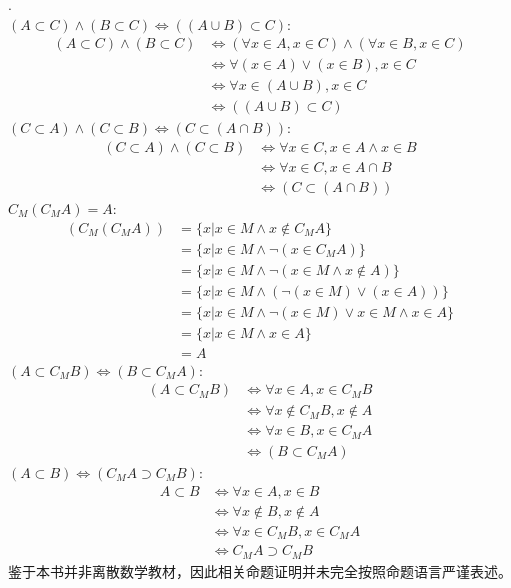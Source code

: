 \begin{solution}
\label{sol:b1-c1-s2-q1}
.\\
$(A\subset C)\land (B\subset C)\Leftrightarrow ((A\cup B)\subset C)$:
\begin{align*}
 (A\subset C)\land (B\subset C)&\Leftrightarrow (\forall x\in A, x\in C)\land (\forall x\in B,x\in C)\\
&\Leftrightarrow \forall (x\in A)\lor (x\in B),x\in C\\
&\Leftrightarrow \forall x\in (A\cup B),x\in C\\
&\Leftrightarrow ((A\cup B)\subset C)
\end{align*}
$(C\subset A)\land (C\subset B)\Leftrightarrow (C\subset (A\cap B))$:
\begin{align*}
(C\subset A)\land (C\subset B)&\Leftrightarrow \forall x\in C,x\in A\land x\in B\\
&\Leftrightarrow \forall x\in C,x\in A\cap B\\
&\Leftrightarrow (C\subset (A\cap B))
\end{align*}
$C_M(C_M A)=A$:
\begin{align*}
(C_M(C_M A))&=\{x| x\in M\land x\notin C_M A\}\\
&=\{x| x\in M\land \lnot (x\in C_M A) \}\\
&=\{x| x\in M\land \lnot(x\in M\land x\notin A)\}\\
&=\{x| x\in M \land (\lnot(x\in M)\lor (x\in A))\}\\
&=\{x| x\in M\land \lnot (x\in M)\lor x\in M\land x\in A \}\\
&=\{x| x\in M\land x\in A\}\\
&=A
\end{align*}
$(A\subset C_M B)\Leftrightarrow (B\subset C_M A)$:
\begin{align*}
(A\subset C_M B)&\Leftrightarrow \forall x\in A, x\in C_M B\\
&\Leftrightarrow \forall x\notin C_M B,x\notin A\\
&\Leftrightarrow \forall x\in B,x\in C_M A\\
&\Leftrightarrow (B\subset C_M A)
\end{align*}
$(A\subset B)\Leftrightarrow (C_M A\supset C_M B)$:
\begin{align*}
A\subset B&\Leftrightarrow \forall x\in A,x\in B\\
&\Leftrightarrow \forall x\notin B,x\notin A\\
&\Leftrightarrow \forall x\in C_M B,x\in C_M A\\
&\Leftrightarrow C_M A\supset C_M B
\end{align*}
鉴于本书并非离散数学教材，因此相关命题证明并未完全按照命题语言严谨表述。
\end{solution}

